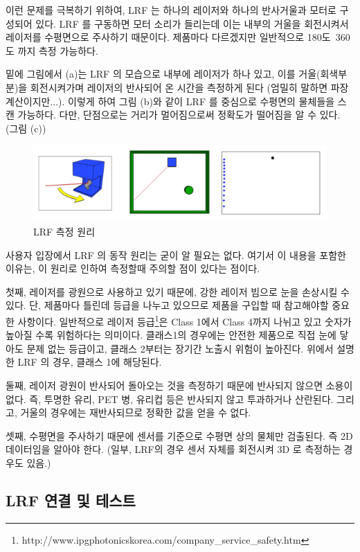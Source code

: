 이런 문제를 극복하기 위하여, LRF 는 하나의 레이저와 하나의 반사거울과 모터로 구성되어 있다. LRF 를 구동하면 모터 소리가 들리는데 이는 내부의 거울을 회전시켜서 레이저를 수평면으로 주사하기 때문이다. 제품마다 다르겠지만 일반적으로 180도~360도 까지 측정 가능하다. 

밑에 그림에서 (a)는 LRF 의 모습으로 내부에 레이저가 하나 있고, 이를 거울(회색부분)을 회전시켜가며 레이저의 반사되어 온 시간을 측정하게 된다 (엄밀히 말하면 파장계산이지만...). 이렇게 하여 그림 (b)와 같이 LRF 를 중심으로 수평면의 물체들을 스캔 가능하다. 다만, 단점으로는 거리가 멀어짐으로써 정확도가 떨어짐을 알 수 있다. (그림 (c))

\begin{figure}[h]
\centering\includegraphics[width=0.8\columnwidth]{pictures/chapter9/mechanism_lrf.png}
\caption{LRF 측정 원리}
\end{figure}

사용자 입장에서 LRF 의 동작 원리는 굳이 알 필요는 없다. 여기서 이 내용을 포함한 이유는, 이 원리로 인하여 측정할때 주의할 점이 있다는 점이다. 

첫째, 레이저를 광원으로 사용하고 있기 때문에, 강한 레이저 빔으로 눈을 손상시킬 수 있다. 단, 제품마다 틀린데 등급을 나누고 있으므로 제품을 구입할 때 참고해야할 중요한 사항이다. 일반적으로 레이저 등급\footnote{http://www.ipgphotonicskorea.com/company\_service\_safety.htm}은 Class 1에서 Class 4까지 나뉘고 있고 숫자가 높아질 수록 위험하다는 의미이다. 클래스1의 경우에는 안전한 제품으로 직접 눈에 닿아도 문제 없는 등급이고, 클래스 2부터는 장기간 노출시 위험이 높아진다. 위에서 설명한 LRF 의 경우, 클래스 1에 해당된다.

둘째, 레이저 광원이 반사되어 돌아오는 것을 측정하기 때문에 반사되지 않으면 소용이 없다. 즉, 투명한 유리, PET 병, 유리컵 등은 반사되지 않고 투과하거나 산란된다. 그리고, 거울의 경우에는 재반사되므로 정확한 값을 얻을 수 없다.

셋째, 수평면을 주사하기 때문에 센서를 기준으로 수평면 상의  물체만 검출된다. 즉 2D 데이터임을 알아야 한다. (일부, LRF의 경우 센서 자체를 회전시켜 3D 로 측정하는 경우도 있음.)

\subsection{LRF 연결 및 테스트}

